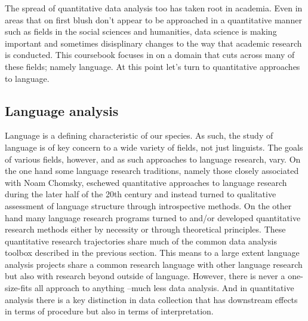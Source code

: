 \documentclass[
]{article}
\begin{document}
The spread of quantitative data analysis too has taken root in academia. Even in areas that on first blush don't appear to be approached in a quantitative manner such as fields in the social sciences and humanities, data science is making important and sometimes disisplinary changes to the way that academic research is conducted. This coursebook focuses in on a domain that cuts across many of these fields; namely language. At this point let's turn to quantitative approaches to language.

\hypertarget{language-analysis}{%
\subsection{Language analysis}\label{language-analysis}}

Language is a defining characteristic of our species. As such, the study of language is of key concern to a wide variety of fields, not just linguists. The goals of various fields, however, and as such approaches to language research, vary. On the one hand some language research traditions, namely those closely associated with Noam Chomsky, eschewed quantitative approaches to language research during the later half of the 20th century and instead turned to qualitative assessment of language structure through introspective methods. On the other hand many language research programs turned to and/or developed quantitative research methods either by necessity or through theoretical principles. These quantitative research trajectories share much of the common data analysis toolbox described in the previous section. This means to a large extent language analysis projects share a common research language with other language research but also with research beyond outside of language. However, there is never a one-size-fits all approach to anything --much less data analysis. And in quantitative analysis there is a key distinction in data collection that has downstream effects in terms of procedure but also in terms of interpretation.
\end{document}
